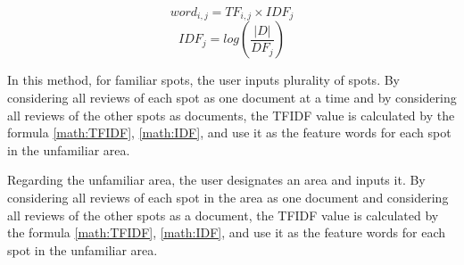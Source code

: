 \documentclass[journal]{IAENGtran}
\begin{document}
\begin{equation}
  word_{i,j} = TF_{i,j} \times IDF_{j}
  \label{math:TFIDF}
\end{equation}
\begin{equation}
  IDF_{j} = log(\frac{|D|}{DF_{j}})
  \label{math:IDF}
\end{equation}

In this method, for familiar spots, the user inputs plurality of spots.
By considering all reviews of each spot as one document at a time and by considering all reviews of the other spots as documents, the TFIDF value is calculated by the formula \ref{math:TFIDF}, \ref{math:IDF}, and use it as the feature words for each spot in the unfamiliar area.

Regarding the unfamiliar area, the user designates an area and inputs it.
By considering all reviews of each spot in the area as one document and considering all reviews of the other spots as a document, the TFIDF value is calculated by the formula \ref{math:TFIDF}, \ref{math:IDF}, and use it as the feature words for each spot in the unfamiliar area.
\end{document}
